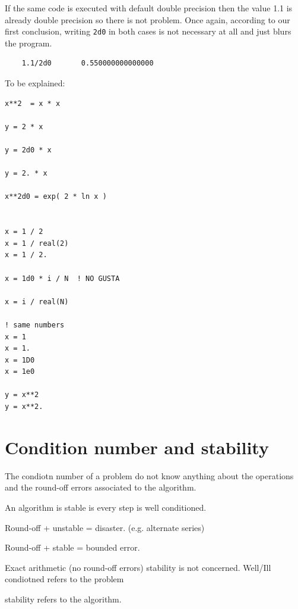 
If the same code is executed with default double precision then the value 1.1 is already double precision so there is not problem. Once again, according to our first conclusion, writing \texttt{2d0} in both cases is not necessary at all and just blurs the program.

\begin{verbatim}
    1.1/2d0       0.550000000000000
\end{verbatim}





To be explained:

\begin{verbatim} 
x**2  = x * x 

y = 2 * x 

y = 2d0 * x 

y = 2. * x 

x**2d0 = exp( 2 * ln x ) 


x = 1 / 2
x = 1 / real(2) 
x = 1 / 2. 

x = 1d0 * i / N  ! NO GUSTA 

x = i / real(N) 

! same numbers 
x = 1 
x = 1. 
x = 1D0 
x = 1e0 

y = x**2
y = x**2.

\end{verbatim} 






\section{Condition number and stability} 
    
The condiotn number of a problem do not know anything about the operations 
and the round-off errors associated to the algorithm.  

An algorithm is stable is every step is well conditioned. 

Round-off + unstable = disaster. (e.g. alternate series)

Round-off + stable = bounded error. 

Exact arithmetic (no round-off errors) stability is not concerned. 
Well/Ill condiotned refers to the problem 

stability refers to the algorithm. 

